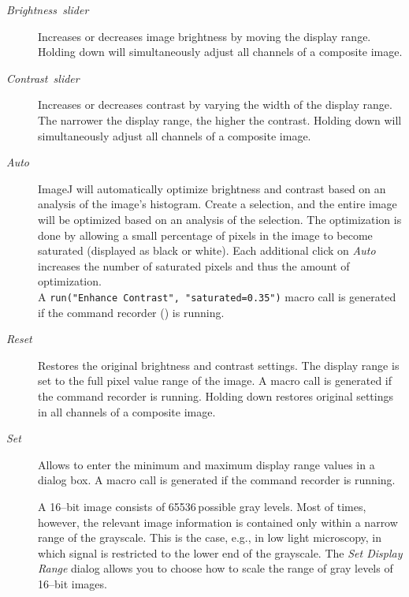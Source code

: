 \begin{description}
\item [{\emph{Brightness\ slider}}] Increases or decreases image brightness
by moving the display range. Holding down  will
simultaneously adjust all channels of a composite image.
\item [{\emph{Contrast\ slider}}] Increases or decreases contrast by varying
the width of the display range. The narrower the display range, the
higher the contrast. Holding down  will simultaneously
adjust all channels of a composite image.
\item [{\emph{Auto}}] ImageJ will automatically optimize brightness and
contrast based on an analysis of the image's histogram. Create a selection,
and the entire image will be optimized based on an analysis of the
selection. The optimization is done by allowing a small percentage
of pixels in the image to become saturated (displayed as black or
white). Each additional click on \emph{Auto} increases the number
of saturated pixels and thus the amount of optimization.\\
 A \lstinline[basicstyle={\small\ttfamily}]!run("Enhance Contrast", "saturated=0.35")!
macro call is generated if the command recorder ()
is running.
\item [{\emph{Reset}}] Restores the original brightness and contrast settings.
The display range is set to the full pixel value range of the image.
A  macro call is generated if the command
recorder is running. Holding down  restores original
settings in all channels of a composite image.
\item [{\emph{Set}}] Allows to enter the minimum and maximum display range
values in a dialog box. A  macro call is generated
if the command recorder is running. 


A 16--bit image consists of 65536\,possible gray levels. Most of
times, however, the relevant image information is contained only within
a narrow range of the grayscale. This is the case, e.g., in low light
microscopy, in which signal is restricted to the lower end of the
grayscale. The \emph{Set Display Range} dialog  allows you to choose
how to scale the range of gray levels of 16--bit images.



\end{description}
